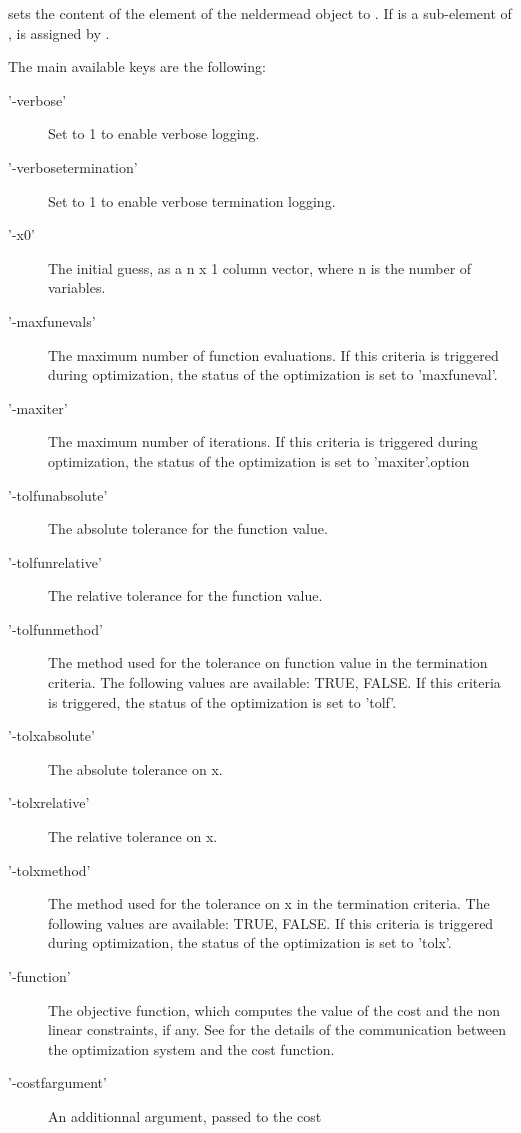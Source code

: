 \begin{Details}\relax
{} sets the content of the  element of
the neldermead object  to . If  is a
sub-element of ,  is assigned by
.

The main available keys are the following:\begin{description}

\item['-verbose'] Set to 1 to enable verbose logging.
\item['-verbosetermination'] Set to 1 to enable verbose termination
logging.
\item['-x0'] The initial guess, as a n x 1 column vector, where n is the
number of variables.
\item['-maxfunevals'] The maximum number of function evaluations. If this
criteria is triggered during optimization, the status of the optimization
is set to 'maxfuneval'.
\item['-maxiter'] The maximum number of iterations. If this criteria is
triggered during optimization, the status of the optimization is set to
'maxiter'.option
\item['-tolfunabsolute'] The absolute tolerance for the function value.
\item['-tolfunrelative'] The relative tolerance for the function value.
\item['-tolfunmethod'] The method used for the tolerance on function value
in the termination criteria. The following values are available: TRUE,
FALSE. If this criteria is triggered, the status of the optimization is
set to 'tolf'.
\item['-tolxabsolute'] The absolute tolerance on x.
\item['-tolxrelative'] The relative tolerance on x.
\item['-tolxmethod'] The method used for the tolerance on x in the
termination criteria. The following values are available: TRUE, FALSE. If
this criteria is triggered during optimization, the status of the
optimization is set to 'tolx'.
\item['-function'] The objective function, which computes the value of the
cost and the non linear constraints, if any. See
 for the details of
the communication between the optimization system and the cost function.
\item['-costfargument'] An additionnal argument, passed to the cost

\end{description}
\end{Details}
